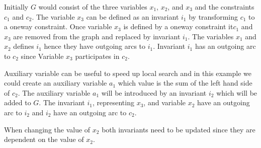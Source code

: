 Initially $G$ would consist of the three variables $x_1$, $x_2$, and $x_3$ and the constraints $c_1$ and $c_2$. The 
variable $x_3$ can be defined as an invariant $i_1$ by transforming $c_1$ to a oneway constraint. Once 
variable $x_3$ is defined by a oneway constraint it$c_1$ and $x_3$ are removed from the graph and replaced by invariant 
$i_1$. The variables $x_1$ and $x_2$ defines $i_1$ hence they have outgoing arcs to $i_1$. Invariant $i_1$ has an 
outgoing arc to $c_2$ since Variable $x_3$ participates in $c_2$.
\begin{center}
    \label{fig_smallG}
\end{center}
Auxiliary variable can be useful to speed up local search and in this example we could create an auxiliary 
variable $a_1$ which value is the sum of the left hand side of $c_2$. The auxiliary variable $a_1$ will be introduced 
by an invariant $i_2$ which will be added to $G$. The invariant $i_1$, representing $x_3$, and variable $x_2$ have 
an outgoing arc to $i_2$ and $i_2$ have an outgoing arc to $c_2$.
\begin{center}
    \label{fig_smallG2}
\end{center}
When changing the value of $x_2$ both invariants need to be updated since they are dependent on the value of $x_2$. 
